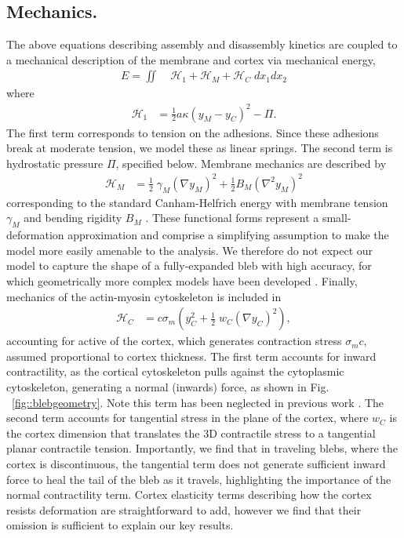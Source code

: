 \subsection{Mechanics.}
The above equations describing assembly and disassembly kinetics are coupled to a mechanical description of the membrane and cortex via mechanical energy,
\begin{align}
E = \iint&\;   \mathcal{H}_1 + \mathcal{H}_M + \mathcal{H}_C \; dx_1 dx_2 \label{eq::energy}
\end{align}
where 
\begin{align}
\mathcal{H}_1 &= \frac{1}{2}a\kappa \left(y_M-y_C\right)^2 - \Pi.
\end{align}
The first term corresponds to tension on the adhesions. Since these adhesions break at moderate tension, we model these as linear springs. The second term is hydrostatic pressure $\Pi$, specified below. Membrane mechanics are described by
\begin{align}
\mathcal{H}_M &= \frac{1}{2}\; \gamma_M \left( \nabla y_M \right)^2 + \frac{1}{2}B_M \left( \nabla^2 y_M \right)^2 
\end{align}
corresponding to the standard Canham-Helfrich energy with membrane tension $\gamma_M$ and bending rigidity $B_M$ \cite{Helfrich:1973td,Alert:2015gz,Woolley:2014jm,Lim:2012fz}. These functional forms represent a small-deformation approximation and comprise a simplifying assumption to make the model more easily amenable to the analysis. We therefore do not expect our model to capture the shape of a fully-expanded bleb with high accuracy, for which geometrically more complex models have been developed \cite{Woolley:2015jn}. Finally, mechanics of the actin-myosin cytoskeleton is included in
\begin{align}
\mathcal{H}_C &= c\sigma_m \left( y_C^2 + \frac{1}{2}\; w_C \left( \nabla y_C \right)^2 \right), 
\end{align}
accounting for active of the cortex, which generates contraction stress $\sigma_m c$, assumed proportional to cortex thickness. The first term accounts for inward contractility, as the cortical cytoskeleton pulls against the cytoplasmic cytoskeleton, generating a normal (inwards) force, {as shown in  Fig. ~\ref{fig::blebgeometry}}. Note this term has been neglected in previous work \cite{Lim:2012fz}. The second term accounts for tangential stress in the plane of the cortex, where $w_C$ is the cortex dimension that translates the 3D contractile stress to a tangential planar contractile tension. Importantly, we find that in traveling blebs, where the cortex is discontinuous, the tangential term does not generate sufficient inward force to heal the tail of the bleb as it travels, highlighting the importance of the normal contractility term. Cortex elasticity terms describing how the cortex resists deformation are straightforward to add, however we find that their omission is sufficient to explain our key results. 

